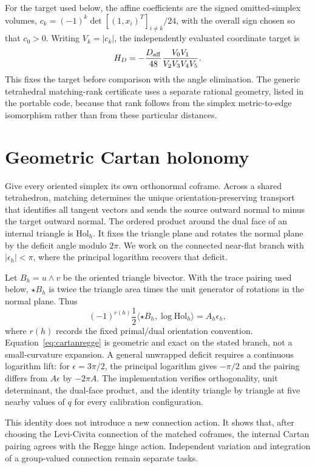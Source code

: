 \documentclass[11pt]{article}
\theoremstyle{definition}
\theoremstyle{remark}
\begin{document}
For the target used below, the affine coefficients are the signed omitted-simplex volumes, $c_k=(-1)^k\det[(1,x_i)^T]_{i\ne k}/24$, with the overall sign chosen so that $c_0>0$.
Writing $V_k=|c_k|$, the independently evaluated coordinate target is
\begin{equation}
 H_D=-\frac{D_{\rm aff}}{48}\frac{V_0V_1}{V_2V_3V_4V_5}.
\end{equation}
This fixes the target before comparison with the angle elimination.
The generic tetrahedral matching-rank certificate uses a separate rational geometry, listed in the portable code, because that rank follows from the simplex metric-to-edge isomorphism rather than from these particular distances.

\section{Geometric Cartan holonomy}

Give every oriented simplex its own orthonormal coframe.  Across a shared tetrahedron, matching determines the unique orientation-preserving transport that identifies all tangent vectors and sends the source outward normal to minus the target outward normal.  The ordered product around the dual face of an internal triangle is $\mathrm{Hol}_h$.  It fixes the triangle plane and rotates the normal plane by the deficit angle modulo $2\pi$.
We work on the connected near-flat branch with $|\epsilon_h|<\pi$, where the principal logarithm recovers that deficit.

Let $B_h=u\wedge v$ be the oriented triangle bivector.  With the trace pairing used below, $\star B_h$ is twice the triangle area times the unit generator of rotations in the normal plane.  Thus
\begin{equation}
 (-1)^{r(h)}\frac12\langle\star B_h,\log\mathrm{Hol}_h\rangle
 =A_h\epsilon_h,
 \label{eq:cartanregge}
\end{equation}
where $r(h)$ records the fixed primal/dual orientation convention.  Equation~\eqref{eq:cartanregge} is geometric and exact on the stated branch, not a small-curvature expansion.
A general unwrapped deficit requires a continuous logarithm lift: for $\epsilon=3\pi/2$, the principal logarithm gives $-\pi/2$ and the pairing differs from $A\epsilon$ by $-2\pi A$.  The implementation verifies orthogonality, unit determinant, the dual-face product, and the identity triangle by triangle at five nearby values of $q$ for every calibration configuration.

This identity does not introduce a new connection action.  It shows that, after choosing the Levi-Civita connection of the matched coframes, the internal Cartan pairing agrees with the Regge hinge action.  Independent variation and integration of a group-valued connection remain separate tasks.
\end{document}
